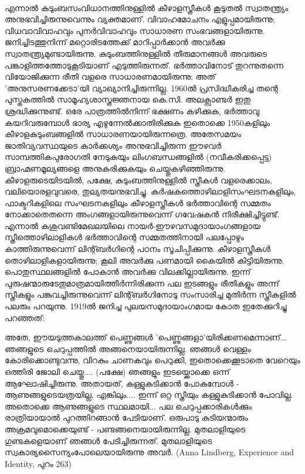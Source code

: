 \paragraph{}എന്നാൽ കുടുംബസംവിധാനത്തിനുള്ളിൽ കീഴാളസ്ത്രീകൾ കൂടുതൽ സ്വാതന്ത്ര്യം അനുഭവിച്ചിരുന്നുവെന്നും വ്യക്തമാണ്. വിവാഹമോചനം എളുപ്പമായിരുന്നു; വിധവാവിവാഹവും പുനർവിവാഹവും സാധാരണ സംഭവങ്ങളായിരുന്നു. ജനിച്ചിടത്തുനിന്ന് മറ്റൊരിടത്തേക്ക് മാറിപ്പാർക്കാൻ അവർക്കു സ്വാതന്ത്ര്യമുണ്ടായിരുന്നു. കുടുംബത്തിനുള്ളിൽ തീരുമാനങ്ങൾ അവരുടെ പങ്കാളിത്തത്തോടുകൂടിയാണ് എടുത്തിരുന്നത്. ഭർത്താവിനോട് തുറന്നുതന്നെ വിയോജിക്കുന്ന രീതി വളരെ സാധാരണമായിരുന്നു; അത് 'അനുസരണക്കേടാ'യി വ്യാഖ്യാനിച്ചിരുന്നില്ല. 1960ൽ പ്രസിദ്ധീകരിച്ച തന്റെ പുസ്തകത്തിൽ സാമൂഹ്യശാസ്ത്രജ്ഞനായ കെ.സി. അലക്സാണ്ടർ ഇതു ശ്രദ്ധിക്കുന്നുണ്ട്. ഒരേ പാത്രത്തിൽനിന്ന് ഭക്ഷണം കഴിക്കുക, ഭർത്താവു കയറിവരുമ്പോൾ ഭാര്യ എഴുന്നേൽക്കാതിരിക്കുക ഇതൊക്കെ 1950കളിലും കീഴാളകുടുംബങ്ങളിൽ സാധാരണയായിരുന്നത്രെ. അതേസമയം ജാതിവ്യവസ്ഥയുടെ കാർക്കശ്യം അനുഭവിച്ചിരുന്ന ഈഴവർ സാമ്പത്തികപുരോഗതി നേടുകയും ലിംഗബന്ധങ്ങളിൽ (നവീകരിക്കപ്പെട്ട) ബ്രാഹ്മണമൂല്യങ്ങളെ അനുകരിക്കുകയും ചെയ്തുകഴിഞ്ഞിരുന്നു. കീഴാളരുടെയിടയിൽ, പക്ഷേ, കുടുംബത്തിനുള്ളിൽ സ്ത്രീകൾ വളരെക്കാലം, വലിയൊരളവുവരെ, തുല്യതയനുഭവിച്ചു. കർഷകത്തൊഴിലാളിസംഘടനകളിലും, ഫാക്ടറികളിലെ സംഘടനകളിലും കീഴാളസ്ത്രീകൾ ഭർത്താവിന്റെ സമ്മതം നോക്കാതെതന്നെ അംഗങ്ങളായിരുന്നുവെന്ന് ഗവേഷകൻ നിരീക്ഷിച്ചിട്ടുണ്ട്. എന്നാൽ കശുവണ്ടിമേഖലയിലെ നായർ-ഈഴവസമുദായാംഗങ്ങളായ സ്ത്രീത്തൊഴിലാളികൾ ഭർത്താവിന്റെ സമ്മതത്തിനായി പലപ്പോഴും കാത്തിരുന്നുവെന്ന് ലിന്റ്ബർഗിന്റെ പഠനം സൂചിപ്പിക്കുന്നു. കീഴാളസ്ത്രീകൾ തൊഴിലാളികളായിരുന്നു; കൂലി അവർക്കു പണമായി കൈയിൽ കിട്ടിയിരുന്നു. പൊതുസ്ഥലങ്ങളിൽ പോകാൻ അവർക്കു വിലക്കില്ലായിരുന്നു. ഇന്ന് പുരുഷന്മാരുടേതുമാത്രമായിത്തീർന്നിരിക്കുന്ന പല ഇടങ്ങളും രീതികളും അന്ന് സ്ത്രീകളും പങ്കുവച്ചിരുന്നുവെന്ന് ലിന്റ്ബർഗിനോടു സംസാരിച്ച മുതിർന്ന സ്ത്രീകളിൽ പലരും പറയുന്നു. 1919ൽ ജനിച്ച പുലയസമുദായാംഗമായ കോത ഇതേക്കുറിച്ചു പറഞ്ഞത്:
\begin{tcolorbox}{}
അതേ, ഈയടുത്തകാലത്ത് പെണ്ണുങ്ങൾ 'പെണ്ണുങ്ങളാ'യിരിക്കണമെന്നാണ്... ഞങ്ങളുടെ ചെറുപ്പത്തിൽ അങ്ങനെയായിരുന്നില്ല. ഞങ്ങൾ വെള്ളം കോരിക്കൊണ്ടുവന്നു, വിറകും ചാണകവും പെറുക്കി, ഇതൊക്കെക്കൂടാതെ വേറെയും ഒത്തിരി ജോലി ചെയ്തു.... (പക്ഷേ) ഞങ്ങളും ഇടയ്ക്കൊക്കെ ഒന്ന് ആഘോഷിച്ചിരുന്നു. അതായത്, കള്ളുകുടിക്കാൻ പോകുമ്പോൾ - ആണുങ്ങളുടെയത്രയില്ല, എങ്കിലും.... ഇന്ന് ഒറ്റ സ്ത്രീയും കള്ളുകുടിക്കാൻ പോവില്ല. അതൊക്കെ ആണുങ്ങളുടെ സ്ഥലമായി... പല ചെറുപ്പക്കാരികൾക്കും രാത്രിയായാൽ പുറത്തിറങ്ങാൻ പേടിയാണ്. ഒരുപാടു കുടിയന്മാരും അക്രമവുമൊക്കെയുണ്ട് - പണ്ടങ്ങനെയായിരുന്നില്ല. മുതലാളിയുടെ ഗുണ്ടകളെയാണ് ഞങ്ങൾ പേടിച്ചിരുന്നത്. മുതലാളിയുടെ സ്വകാര്യസൈന്യംപോലെയായിരുന്നു അവർ.
(Anna Lindberg, Experience and Identity, പുറം 263)
\end{tcolorbox}
